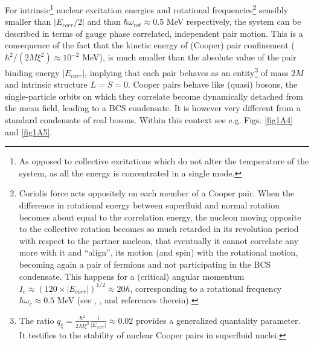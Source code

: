 For intrinsic\footnote{As opposed to collective excitations which do not alter the temperature of the system, as all the energy is concentrated in a single mode.} nuclear excitation energies and rotational frequencies\footnote{Coriolis force acts oppositely on each member of a Cooper pair. When the difference in rotational energy between superfluid and normal rotation becomes about equal to the correlation energy, the nucleon moving opposite to the collective rotation becomes so much retarded in its revolution period with respect to the partner nucleon, that eventually it cannot correlate any more with it and ``align'', its motion (and spin) with the rotational motion, becoming again a pair of fermions and not participating in the BCS  condensate. This happens for a (critical) angular momentum $I_c\approx(120\times|E_{corr}|)^{1/2}\approx 20\hbar$, corresponding to a rotational frequency $\hbar\omega_c\approx 0.5$ MeV (see \cite{Bohr:75}, \cite{Brink:05}, \cite{Broglia:13} and references therein).} sensibly smaller than $|E_{corr}/2|$ and than $\hbar\omega_{rot}\approx0.5$ MeV respectively, the system can be described in terms of gauge phase correlated, independent pair motion. This is a consequence of the fact that the kinetic energy of (Cooper) pair confinement ($\hbar^2/(2M\xi^2)\approx 10^{-2}$ MeV), is much smaller than the absolute value of the pair binding energy $|E_{corr}|$, implying that each pair behaves as an entity\footnote{The ratio $q_\xi=\frac{\hbar^2}{2M\xi^2}\frac{1}{|E_{corr}|}\approx 0.02$ provides a generalized quantality parameter. It testifies to the stability of nuclear Cooper pairs in superfluid nuclei.} of mass $2M$ and intrinsic structure $L=S=0$. Cooper pairs behave like (quasi) bosons, the single-particle orbits on which they correlate become dynamically detached from the mean field, leading to a BCS condensate. It is however very different from a standard condensate of real bosons. Within this context see e.g. Figs. \ref{fig1A4} and \ref{fig1A5}.

